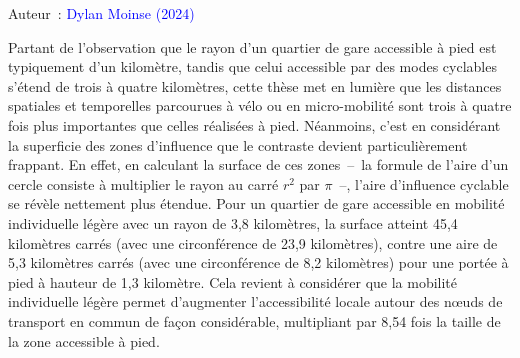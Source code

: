 \begin{refsegment}
\begin{carte}[h!]
        \vspace{5pt}
        \begin{flushright}\scriptsize{
        Auteur~: \textcolor{blue}{Dylan Moinse (2024)}
        }\end{flushright}
    \end{carte}

Partant de l'observation que le rayon d'un quartier de gare accessible à pied est typiquement d'un kilomètre, tandis que celui accessible par des modes cyclables s'étend de trois à quatre kilomètres, cette thèse met en lumière que les distances spatiales et temporelles parcourues à vélo ou en micro-mobilité sont trois à quatre fois plus importantes que celles réalisées à pied. Néanmoins, c'est en considérant la superficie des zones d'influence que le contraste devient particulièrement frappant. En effet, en calculant la surface de ces zones~–~la formule de l'aire d'un cercle consiste à multiplier le rayon au carré \(r^2\) par \(\pi\)~–, l'aire d'influence cyclable se révèle nettement plus étendue. Pour un quartier de gare accessible en mobilité individuelle légère avec un rayon de 3,8 kilomètres, la surface atteint 45,4 kilomètres carrés (avec une circonférence de 23,9 kilomètres), contre une aire de 5,3 kilomètres carrés (avec une circonférence de 8,2 kilomètres) pour une portée à pied à hauteur de 1,3 kilomètre. Cela revient à considérer que la mobilité individuelle légère permet d'augmenter l'accessibilité locale autour des nœuds de transport en commun de façon considérable, multipliant par 8,54 fois la taille de la zone accessible à pied.%


\end{refsegment}
